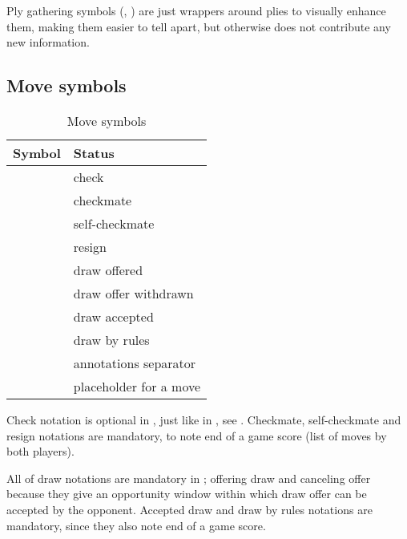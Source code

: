 Ply gathering symbols (\alg{[}, \alg{]}) are just wrappers around plies to visually
enhance them, making them easier to tell apart, but otherwise does not contribute any
new information.

\clearpage %

\subsection*{Move symbols}
\label{sec:Appendix/Summary/Move symbols}

\begin{table}[!h]
\centering
\begin{tabular}{ rl }
\toprule
\textbf{Symbol}      & \textbf{Status}                \\
\midrule
\alg{+}              & check                          \\
\alg{\#}             & checkmate                      \\
\alg{\#}             & self-checkmate                 \\
\alg{\#\#}           & resign                         \\ \cmidrule{1-2}
\alg{(=)}            & draw offered                   \\
\alg{(-)}            & draw offer withdrawn           \\
\alg{(==)}           & draw accepted                  \\
\alg{(===)}          & draw by rules                  \\ \cmidrule{1-2}
\alg{\_}             & annotations separator          \\
\alg{...}            & placeholder for a move         \\
\bottomrule
\end{tabular}
\caption{Move symbols}
\label{tbl:Appendix/Summary/Move symbols}
\end{table}

Check notation is optional in , just like in , see
. Checkmate, self-checkmate and resign notations are mandatory,
to note end of a game score (list of moves by both players).

All of draw notations are mandatory in ; offering draw and canceling
offer because they give an opportunity window within which draw offer can be
accepted by the opponent. Accepted draw and draw by rules notations are mandatory,
since they also note end of a game score.

